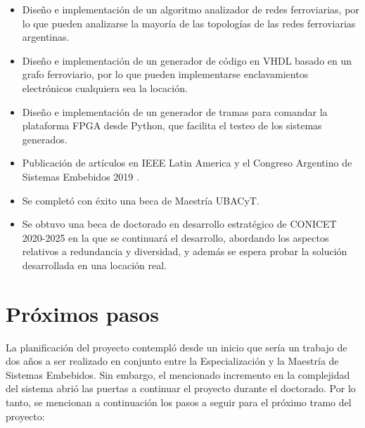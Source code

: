 	\begin{itemize}
		\item Diseño e implementación de un algoritmo analizador de redes ferroviarias, por lo que pueden analizarse la mayoría de las topologías de las redes ferroviarias argentinas.
		\item Diseño e implementación de un generador de código en VHDL basado en un grafo ferroviario, por lo que pueden implementarse enclavamientos electrónicos cualquiera sea la locación.
		\item Diseño e implementación de un generador de tramas para comandar la plataforma FPGA desde Python, que facilita el testeo de los sistemas generados.
		\item Publicación de artículos en IEEE Latin America y el Congreso Argentino de Sistemas Embebidos 2019 \cite{IEEE_LAT}.
		\item Se completó con éxito una beca de Maestría UBACyT.
		\item Se obtuvo una beca de doctorado en desarrollo estratégico de CONICET 2020-2025 en la que se continuará el desarrollo, abordando los aspectos relativos a redundancia y diversidad, y además se espera probar la solución desarrollada en una locación real.
	\end{itemize}
	
\section{Próximos pasos}

	La planificación del proyecto contempló desde un inicio que sería un trabajo de dos años a ser realizado en conjunto entre la Especialización y la Maestría de Sistemas Embebidos. Sin embargo, el mencionado incremento en la complejidad del sistema abrió las puertas a continuar el proyecto durante el doctorado. Por lo tanto, se mencionan a continuación los pasos a seguir para el próximo tramo del proyecto:	
	

